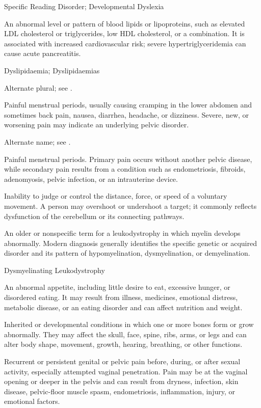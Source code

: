 \synonyms
Specific Reading Disorder; Developmental Dyslexia

 An abnormal level or pattern of blood lipids or lipoproteins, such as elevated LDL cholesterol or triglycerides, low HDL cholesterol, or a combination. It is associated with increased cardiovascular risk; severe hypertriglyceridemia can cause acute pancreatitis.

\synonyms
Dyslipidaemia; Dyslipidaemias

 Alternate plural; see .

 Painful menstrual periods, usually causing cramping in the lower abdomen and sometimes back pain, nausea, diarrhea, headache, or dizziness. Severe, new, or worsening pain may indicate an underlying pelvic disorder.

 Alternate name; see .

 Painful menstrual periods. Primary pain occurs without another pelvic disease, while secondary pain results from a condition such as endometriosis, fibroids, adenomyosis, pelvic infection, or an intrauterine device.

 Inability to judge or control the distance, force, or speed of a voluntary movement. A person may overshoot or undershoot a target; it commonly reflects dysfunction of the cerebellum or its connecting pathways.

 An older or nonspecific term for a leukodystrophy in which myelin develops abnormally. Modern diagnosis generally identifies the specific genetic or acquired disorder and its pattern of hypomyelination, dysmyelination, or demyelination.

\synonyms
Dysmyelinating Leukodystrophy

 An abnormal appetite, including little desire to eat, excessive hunger, or disordered eating. It may result from illness, medicines, emotional distress, metabolic disease, or an eating disorder and can affect nutrition and weight.

 Inherited or developmental conditions in which one or more bones form or grow abnormally. They may affect the skull, face, spine, ribs, arms, or legs and can alter body shape, movement, growth, hearing, breathing, or other functions.

 Recurrent or persistent genital or pelvic pain before, during, or after sexual activity, especially attempted vaginal penetration. Pain may be at the vaginal opening or deeper in the pelvis and can result from dryness, infection, skin disease, pelvic-floor muscle spasm, endometriosis, inflammation, injury, or emotional factors.


